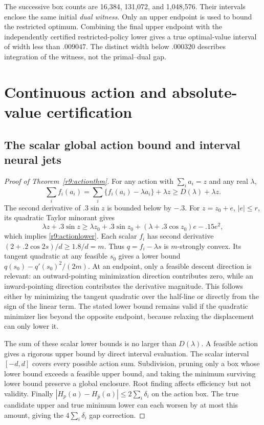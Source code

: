 The successive box counts are 16,384, 131,072, and 1,048,576. Their intervals enclose the same initial \emph{dual witness}. Only an upper endpoint is used to bound the restricted optimum. Combining the final upper endpoint with the independently certified restricted-policy lower gives a true optimal-value interval of width less than $.009047$. The distinct width below $.000320$ describes integration of the witness, not the primal--dual gap.

\section{Continuous action and absolute-value certification}\label{r9:proof:action}
\subsection{The scalar global action bound and interval neural jets}
\begin{proof}[Proof of Theorem~\ref{r9:actionthm}]
For any action with $\sum_i a_i=z$ and any real $\lambda$,
\[
 \sum_i f_i(a_i)=\sum_i\{f_i(a_i)-\lambda a_i\}+\lambda z
 \geq D(\lambda)+\lambda z.
\]
The second derivative of $.3\sin z$ is bounded below by $-.3$. For $z=z_0+e$, $|e|\leq r$, its quadratic Taylor minorant gives
\[
 \lambda z+.3\sin z\geq\lambda z_0+.3\sin z_0
       +(\lambda+.3\cos z_0)e-.15e^2,
\]
which implies \eqref{r9:actionlower}. Each scalar $f_i$ has second derivative $(2+.2\cos2s)/d\geq1.8/d=m$. Thus $q=f_i-\lambda s$ is $m$-strongly convex. Its tangent quadratic at any feasible $s_0$ gives a lower bound $q(s_0)-q'(s_0)^2/(2m)$. At an endpoint, only a feasible descent direction is relevant: an outward-pointing minimization direction contributes zero, while an inward-pointing direction contributes the derivative magnitude. This follows either by minimizing the tangent quadratic over the half-line or directly from the sign of the linear term. The stated lower bound remains valid if the quadratic minimizer lies beyond the opposite endpoint, because relaxing the displacement can only lower it.

The sum of these scalar lower bounds is no larger than $D(\lambda)$. A feasible action gives a rigorous upper bound by direct interval evaluation. The scalar interval $[-d,d]$ covers every possible action sum. Subdivision, pruning only a box whose lower bound exceeds a feasible upper bound, and taking the minimum surviving lower bound preserve a global enclosure. Root finding affects efficiency but not validity. Finally $|H_p(a)-H_{\widehat p}(a)|\leq2\sum_i\delta_i$ on the action box. The true candidate upper and true minimum lower can each worsen by at most this amount, giving the $4\sum_i\delta_i$ gap correction.
\end{proof}


